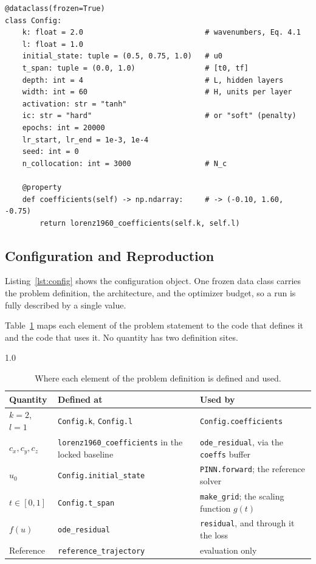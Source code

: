 \begin{lstlisting}[caption={The configuration object, abridged.}, label={lst:config}]
@dataclass(frozen=True)
class Config:
    k: float = 2.0                            # wavenumbers, Eq. 4.1
    l: float = 1.0
    initial_state: tuple = (0.5, 0.75, 1.0)   # u0
    t_span: tuple = (0.0, 1.0)                # [t0, tf]
    depth: int = 4                            # L, hidden layers
    width: int = 60                           # H, units per layer
    activation: str = "tanh"
    ic: str = "hard"                          # or "soft" (penalty)
    epochs: int = 20000
    lr_start, lr_end = 1e-3, 1e-4
    seed: int = 0
    n_collocation: int = 3000                 # N_c

    @property
    def coefficients(self) -> np.ndarray:     # -> (-0.10, 1.60, -0.75)
        return lorenz1960_coefficients(self.k, self.l)
\end{lstlisting}

\subsection{Configuration and Reproduction}

Listing~\ref{lst:config} shows the configuration object. One frozen data class carries the problem definition, the architecture, and the optimizer budget, so a run is fully described by a single value.

Table~\ref{tab:traceability} maps each element of the problem statement to the code that defines it and the code that uses it. No quantity has two definition sites.

\begin{table}[H]
\centering
\caption{Where each element of the problem definition is defined and used.}
\label{tab:traceability}
\begin{spacing}{1.0}
\small
\begin{tabularx}{\textwidth}{|p{2.6cm}|p{4.4cm}|>{\raggedright\arraybackslash}X|}
\hline
\textbf{Quantity} & \textbf{Defined at} & \textbf{Used by} \\
\hline
$k = 2$, $l = 1$ & \texttt{Config.k}, \texttt{Config.l} & \texttt{Config.coefficients} \\
\hline
$c_x, c_y, c_z$ & \texttt{lorenz1960\_coefficients} in the locked baseline & \texttt{ode\_residual}, via the \texttt{coeffs} buffer \\
\hline
$u_0$ & \texttt{Config.initial\_state} & \texttt{PINN.forward}; the reference solver \\
\hline
$t \in [0, 1]$ & \texttt{Config.t\_span} & \texttt{make\_grid}; the scaling function $g(t)$ \\
\hline
$f(u)$ & \texttt{ode\_residual} & \texttt{residual}, and through it the loss \\
\hline
Reference & \texttt{reference\_trajectory} & evaluation only \\
\hline
\end{tabularx}
\end{spacing}
\end{table}


